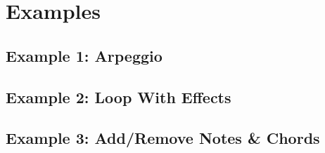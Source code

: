 \documentclass[letterpaper]{article}
\begin{document}
\section{Examples}

\begin{minipage}{\linewidth}
\subsection{Example 1: Arpeggio}

\end{minipage}

\begin{minipage}{\linewidth}
\subsection{Example 2: Loop With Effects}

\end{minipage}

\begin{minipage}{\linewidth}
\subsection{Example 3: Add/Remove Notes \& Chords}

\end{minipage}
\end{document}
